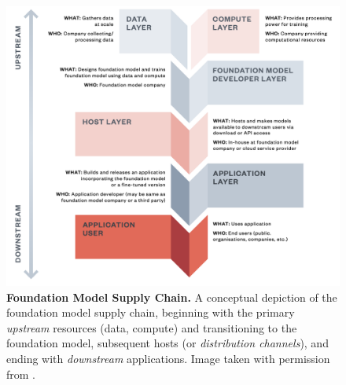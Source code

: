 \begin{figure}
\center
\includegraphics[width=\textwidth]{figures/supply_chain.png}
\caption{\textbf{Foundation Model Supply Chain.} 
A conceptual depiction of the foundation model supply chain, beginning with the primary \textit{upstream} resources (\ie data, compute) and transitioning to the foundation model, subsequent hosts (or \textit{distribution channels}), and ending with \textit{downstream} applications.
Image taken with permission from \citet{jones2023foundationmodels}.}
\label{fig:supply-chain}
\end{figure}

